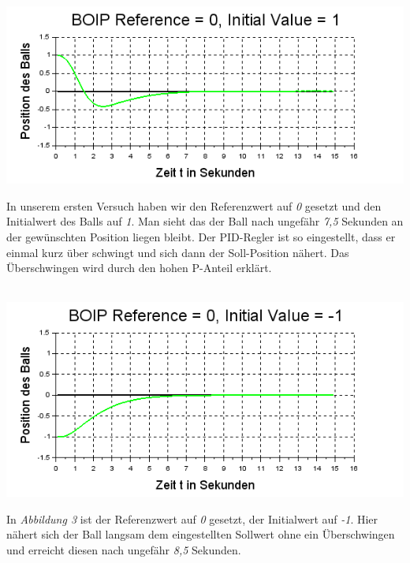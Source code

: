 \begin{center}
	\begin{minipage}{\linewidth}
	\centering
	\includegraphics[scale=0.7]{images/ref0_init1.png}
	\end{minipage}
\end{center}
In unserem ersten Versuch haben wir den Referenzwert auf \textit{0} gesetzt und den Initialwert des Balls auf \textit{1}. Man sieht das der Ball nach ungefähr \textit{7,5} Sekunden an der gewünschten Position liegen bleibt. Der PID-Regler ist so eingestellt, dass er einmal kurz über schwingt und sich dann der Soll-Position nähert. Das Überschwingen wird durch den hohen P-Anteil erklärt.\\ \\

\begin{center}
	\begin{minipage}{\linewidth}
	\centering
	\includegraphics[scale=0.7]{images/ref0_init-1.png}
	\end{minipage}
\end{center}
In \textit{Abbildung 3} ist der Referenzwert auf \textit{0} gesetzt, der Initialwert auf \textit{-1}. Hier nähert sich der Ball langsam dem eingestellten Sollwert ohne ein Überschwingen und erreicht diesen nach ungefähr \textit{8,5} Sekunden. \\ \\


